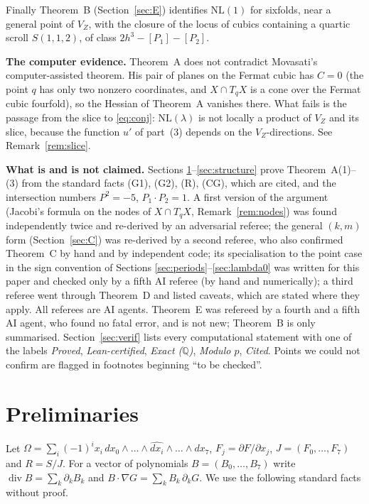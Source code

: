 \documentclass[10pt]{article}
\numberwithin{equation}{section}
\theoremstyle{remark}
\newcommand{\QQ}{\mathbb{Q}}
\newcommand{\NL}{\mathrm{NL}}
\newcommand{\VZ}{V_Z}
\newcommand{\dv}{\operatorname{div}}
\newcommand{\run}[1]{\medskip\noindent\textbf{#1}}
\begin{document}
Finally Theorem~B (Section~\ref{sec:E}) identifies $\NL(1)$ for sixfolds, near a general point of $\VZ$, with
the closure of the locus of cubics containing a quartic scroll $S(1,1,2)$, of class $2h^3-[P_1]-[P_2]$.

\run{The computer evidence.}
Theorem~A does not contradict Movasati's computer-assisted theorem. His pair of planes on the Fermat cubic has
$C=0$ (the point $q$ has only two nonzero coordinates, and $X\cap T_qX$ is a cone over the Fermat cubic fourfold),
so the Hessian of Theorem~A vanishes there. What fails is the passage from the slice to \eqref{eq:conj}:
$\NL(\lambda)$ is not locally a product of $\VZ$ and its slice, because the function $u'$ of part~(3) depends on
the $\VZ$-directions. See Remark~\ref{rem:slice}.

\run{What is and is not claimed.}
Sections \ref{sec:prelim}--\ref{sec:structure} prove Theorem~A(1)--(3) from the standard facts (G1), (G2), (R),
(CG), which are cited, and the intersection numbers $P^2=-5$, $P_1\cdot P_2=1$. A first version of the argument
(Jacobi's formula on the nodes of $X\cap T_qX$, Remark~\ref{rem:nodes}) was found independently twice and
re-derived by an adversarial referee; the general $(k,m)$ form (Section~\ref{sec:C}) was re-derived by a
second referee, who also confirmed Theorem~C by hand and by independent code; its specialisation to the point
case in the sign convention of Sections \ref{sec:periods}--\ref{sec:lambda0} was written for this paper and
checked only by a fifth AI referee (by hand and numerically); a third referee went through
Theorem~D and listed caveats, which are stated where they apply. All referees are AI agents. Theorem~E was
refereed by a fourth and a fifth AI agent, who found no fatal error, and is not new; Theorem~B is only summarised. Section~\ref{sec:verif} lists every computational
statement with one of the labels \emph{Proved}, \emph{Lean-certified}, \emph{Exact ($\QQ$)}, \emph{Modulo $p$},
\emph{Cited}. Points we could not confirm are flagged in footnotes beginning ``to be checked''.

\section{Preliminaries}\label{sec:prelim}
Let $\Omega=\sum_i(-1)^ix_i\,dx_0\wedge\dots\wedge\widehat{dx_i}\wedge\dots\wedge dx_7$, $F_j=\partial F/\partial
x_j$, $J=(F_0,\dots,F_7)$ and $R=S/J$. For a vector of polynomials $B=(B_0,\dots,B_7)$ write $\dv B=\sum_k
\partial_kB_k$ and $B\cdot\nabla G=\sum_kB_k\,\partial_kG$. We use the following standard facts without proof.
\end{document}
